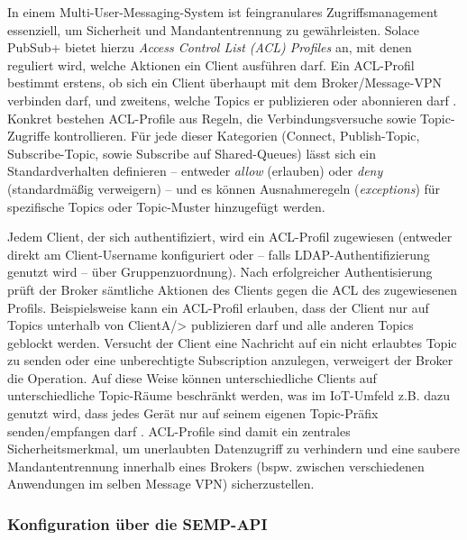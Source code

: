In einem Multi-User-Messaging-System ist feingranulares Zugriffsmanagement essenziell, um Sicherheit und Mandantentrennung zu gewährleisten. Solace PubSub+ bietet hierzu \textit{Access Control List (ACL) Profiles} an, mit denen reguliert wird, welche Aktionen ein Client ausführen darf. Ein ACL-Profil bestimmt erstens, ob sich ein Client überhaupt mit dem Broker/Message-VPN verbinden darf, und zweitens, welche Topics er publizieren oder abonnieren darf \cite{SolaceACL}. Konkret bestehen ACL-Profile aus Regeln, die Verbindungsversuche sowie Topic-Zugriffe kontrollieren. Für jede dieser Kategorien (Connect, Publish-Topic, Subscribe-Topic, sowie Subscribe auf Shared-Queues) lässt sich ein Standardverhalten definieren – entweder \textit{allow} (erlauben) oder \textit{deny} (standardmäßig verweigern) – und es können Ausnahmeregeln (\textit{exceptions}) für spezifische Topics oder Topic-Muster hinzugefügt werden.

Jedem Client, der sich authentifiziert, wird ein ACL-Profil zugewiesen (entweder direkt am Client-Username konfiguriert oder – falls LDAP-Authentifizierung genutzt wird – über Gruppenzuordnung). Nach erfolgreicher Authentisierung prüft der Broker sämtliche Aktionen des Clients gegen die ACL des zugewiesenen Profils. Beispielsweise kann ein ACL-Profil erlauben, dass der Client nur auf Topics unterhalb von ClientA/> publizieren darf und alle anderen Topics geblockt werden. Versucht der Client eine Nachricht auf ein nicht erlaubtes Topic zu senden oder eine unberechtigte Subscription anzulegen, verweigert der Broker die Operation. Auf diese Weise können unterschiedliche Clients auf unterschiedliche Topic-Räume beschränkt werden, was im IoT-Umfeld z.B. dazu genutzt wird, dass jedes Gerät nur auf seinem eigenen Topic-Präfix senden/empfangen darf \cite{AvnetPSK}. ACL-Profile sind damit ein zentrales Sicherheitsmerkmal, um unerlaubten Datenzugriff zu verhindern und eine saubere Mandantentrennung innerhalb eines Brokers (bspw. zwischen verschiedenen Anwendungen im selben Message VPN) sicherzustellen.

\subsubsection{Konfiguration über die SEMP-API}

